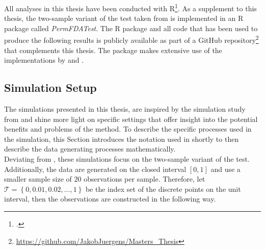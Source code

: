 \documentclass[12pt, a4paper]{article}
\theoremstyle{MAstyle} \newtheorem{assumption}{Assumption}[section]
\theoremstyle{MAstyle} \newtheorem{definition}{Definition}[section]
\theoremstyle{MAstyle} \newtheorem{theorem}{Theorem}[section]
\begin{document}
		All analyses in this thesis have been conducted with R\footcite{R}. As a supplement to this thesis, the two-sample variant of the test taken from \cite{bugni_permutation_2021} is implemented in an R package called \textit{PermFDATest}. The R package and all code that has been used to produce the following results is publicly available as part of a GitHub repository\footnote{\href{https://github.com/JakobJuergens/Masters_Thesis}{https://github.com/JakobJuergens/Masters\_Thesis}} that complements this thesis.
		The package makes extensive use of the implementations by \cite{fda} and \cite{tidyverse}.

		\subsection{Simulation Setup}
		The simulations presented in this thesis, are inspired by the simulation study from \cite{bugni_permutation_2021} and shine more light on specific settings that offer insight into the potential benefits and problems of the method. 
		To describe the specific processes used in the simulation, this Section introduces the notation used in \cite{bugni_permutation_2021} shortly to then describe the data generating processes mathematically. \\
		
		Deviating from \cite{bugni_permutation_2021}, these simulations focus on the two-sample variant of the test. Additionally, the data are generated on the closed interval $\left[0,1\right]$ and use a smaller sample size of $20$ observations per sample. Therefore, let $\mathcal{T} = \left\{0, 0.01, 0.02, \dots, 1\right\}$ be the index set of the discrete points on the unit interval, then the observations are constructed in the following way.\\
		
\end{document}
